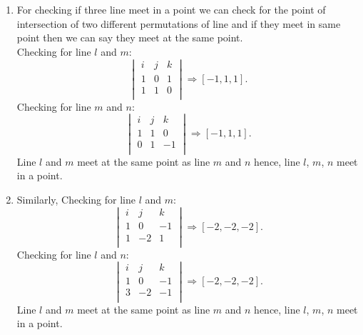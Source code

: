 \documentclass[11pt]{article}
\begin{document}
\begin{enumerate}
\begin{tcolorbox}
\begin{enumerate}[]
\color{blue}
\item
{ For checking if three line meet in a point we can check for the point of intersection of two different permutations of line and if they meet in same point then we can say they meet at the same point.\\
Checking for line $l$ and $m$:
\begin{equation*}
\begin{vmatrix}
        i & j &  k \\ 
        1 & 0 & 1\\
        1 & 1 & 0\\
    \end{vmatrix} \Rightarrow [-1, 1, 1]. 
\end{equation*}
Checking for line $m$ and $n$:
\begin{equation*}
\begin{vmatrix}
        i & j &  k \\ 
        1 & 1 & 0\\
        0 & 1 & -1 \\
    \end{vmatrix} \Rightarrow [-1, 1, 1]. 
\end{equation*}
Line $l$ and $m$ meet at the same point as line $m$ and $n$ hence, line $l$, $m$, $n$ meet in a point.
}
  \item
  Similarly,
Checking for line $l$ and $m$:
\begin{equation*}
\begin{vmatrix}
        i & j &  k \\ 
        1 & 0 & -1\\
        1 & -2 & 1\\
    \end{vmatrix} \Rightarrow [-2, -2, -2]. 
\end{equation*}
Checking for line $l$ and $n$:
\begin{equation*}
\begin{vmatrix}
        i & j &  k \\ 
        1 & 0 & -1 \\
        3 & -2 & -1 \\
    \end{vmatrix} \Rightarrow [-2, -2, -2]. 
\end{equation*}
Line $l$ and $m$ meet at the same point as line $m$ and $n$ hence, line $l$, $m$, $n$ meet in a point.
\end{enumerate}
\end{tcolorbox}

\end{enumerate}
\end{document}
